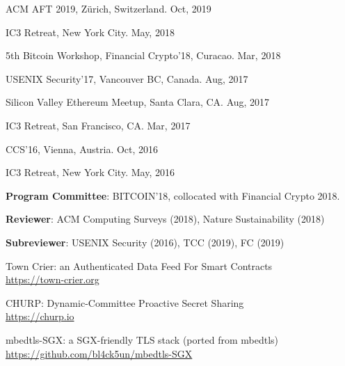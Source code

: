 \vspace{2mm}
\begin{innerlist}
\item ACM AFT 2019, Z\"urich, Switzerland. \hfill Oct, 2019
\item IC3 Retreat, New York City. \hfill May, 2018
\item 5th Bitcoin Workshop, Financial Crypto'18, Curacao. \hfill{Mar, 2018}
\end{innerlist}

\vspace{2mm}
\begin{innerlist}
\item
USENIX Security'17, Vancouver BC, Canada. \hfill{Aug, 2017}
\end{innerlist}

\vspace{2mm}
\begin{innerlist}
\item
Silicon Valley Ethereum Meetup, Santa Clara, CA. \hfill{Aug, 2017}
\item
IC3 Retreat, San Francisco, CA. \hfill{Mar, 2017}
\item
CCS'16, Vienna, Austria. \hfill{Oct, 2016}
\item
IC3 Retreat, New York City. \hfill{May, 2016}
\end{innerlist}

\begin{loneinnerlist}
\item {\bf Program Committee}: BITCOIN'18, collocated with Financial Crypto 2018.
\item {\bf Reviewer}: ACM Computing Surveys (2018), Nature Sustainability (2018)
\item {\bf Subreviewer}: USENIX Security (2016), TCC (2019), FC (2019)
\end{loneinnerlist}

\begin{loneinnerlist}
\item
Town Crier: an Authenticated Data Feed For Smart Contracts \\
\url{https://town-crier.org}

\item
CHURP: Dynamic-Committee Proactive Secret Sharing \\
\url{https://churp.io}

\item
mbedtls-SGX: a SGX-friendly TLS stack (ported from mbedtls)\\
\url{https://github.com/bl4ck5un/mbedtls-SGX}
\end{loneinnerlist}


